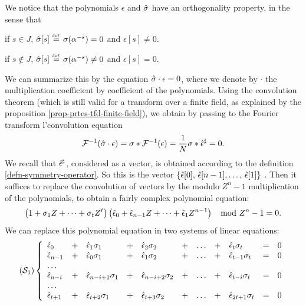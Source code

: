  
We notice that the polynomials $ \epsilon $ and $ \hat{\sigma} $ have an orthogonality property, in the sense that \begin{rs}
\item if $ s \in J $, $ \hat{\sigma}[s] \stackrel{\mbox{\upshape\tiny def.}}{=} \sigma (\alpha^{- s}) = 0 $ and $ \epsilon [s] \neq 0 $.
\item if $ s \notin J $, $ \hat{\sigma}[s] \stackrel{\mbox{\upshape\tiny def.}}{=} \sigma (\alpha^{- s}) \neq 0 $ and $ \epsilon [s] = 0 $.
\end{rs} We can summarize this by the equation $ \hat{\sigma} \cdot \epsilon = 0 $, where we denote by $ \cdot $ the multiplication coefficient by coefficient of the polynomials. Using the convolution theorem (which is still valid for a transform over a finite field, as explained by the proposition \ref{prop-prtes-tfd-finite-field}), we obtain by passing to the Fourier transform l'convolution equation
\begin{equation*}
\mathcal{F}^{-1} (\hat{\sigma} \cdot \epsilon) = \sigma * \mathcal{F}^{-1} (\epsilon) = \frac{1}{N} \sigma * \hat{\epsilon}^{\sharp} = 0.
\end{equation*}
We recall that $ \hat{\epsilon}^{\sharp} $, considered as a vector, is obtained according to the definition \ref{defn-symmetry-operator}. So this is the vector $ \{\hat{\epsilon}[0], \, \hat{\epsilon}[n-1], \ldots, \, \hat{\epsilon}[1]\} $ . Then it suffices to replace the convolution of vectors by the modulo $ Z^{n} -1 $ multiplication of the polynomials, to obtain a fairly complex polynomial equation:
\begin{equation*}
\left(1 + \sigma_1 Z + \cdots + \sigma_t Z^t \right) \left(\hat{\epsilon}_0 + \hat{\epsilon}_{n-1} Z + \cdots + \hat{\epsilon}_1 Z^{n-1} \right) \; \mod{Z^n - 1} = 0.
\end{equation*}
We can replace this polynomial equation in two systems of linear equations:
\begin{equation*}
(\mathcal{S}_1) \left\{ \begin{array}{lllllllllll} \hat{\epsilon}_0 & + & \hat{\epsilon}_1\sigma_1 & + & \hat{\epsilon}_2\sigma_2 & + & \ldots & + & \hat{\epsilon}_t\sigma_t & = & 0 \\ \hat{\epsilon}_{n-1} & + & \hat{\epsilon}_0\sigma_1 & + & \hat{\epsilon}_1\sigma_2 & + & \ldots & + & \hat{\epsilon}_{t-1}\sigma_t & = & 0 \\ \ldots & & & & & & & & & & \\ \hat{\epsilon}_{n-i} & + & \hat{\epsilon}_{n-i+1}\sigma_1 & + & \hat{\epsilon}_{n-i+2}\sigma_2 & + & \ldots & + & \hat{\epsilon}_{t-i}\sigma_t & = & 0 \\ \ldots & & & & & & & & & & \\ \hat{\epsilon}_{t+1} & + & \hat{\epsilon}_{t+2}\sigma_1 & + & \hat{\epsilon}_{t+3}\sigma_2 & + & \ldots & + & \hat{\epsilon}_{2t+1}\sigma_t & = & 0 \end{array} \right.
\end{equation*}
 
